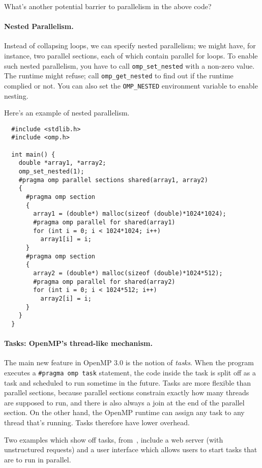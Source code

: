 {\sf What's another potential barrier to parallelism in the above code?}\\

\paragraph{Nested Parallelism.} Instead of collapsing loops, we can
specify nested parallelism; we might have, for instance, two parallel
sections, each of which contain parallel for loops. To enable
such nested parallelism, you have to call \verb+omp_set_nested+ with
a non-zero value. The runtime might refuse; call \verb+omp_get_nested+ to
find out if the runtime complied or not. You can also set the 
\verb+OMP_NESTED+ environment variable to enable nesting.

Here's an example of nested parallelism.
{\small
\begin{verbatim}
  #include <stdlib.h>
  #include <omp.h>

  int main() {
    double *array1, *array2;
    omp_set_nested(1);
    #pragma omp parallel sections shared(array1, array2)
    {
      #pragma omp section
      {
        array1 = (double*) malloc(sizeof (double)*1024*1024);
        #pragma omp parallel for shared(array1)
        for (int i = 0; i < 1024*1024; i++)
          array1[i] = i;
      }
      #pragma omp section
      {
        array2 = (double*) malloc(sizeof (double)*1024*512);
        #pragma omp parallel for shared(array2)
        for (int i = 0; i < 1024*512; i++)
          array2[i] = i;
      }
    }
  }
\end{verbatim}
}

\paragraph{Tasks: OpenMP's thread-like mechanism.}
The main new feature in OpenMP 3.0 is the notion of \emph{tasks}. When
the program executes a \verb+#pragma omp task+ statement, the code
inside the task is split off as a task and scheduled to run sometime
in the future. Tasks are more flexible than parallel sections, because
parallel sections constrain exactly how many threads are supposed to
run, and there is also always a join at the end of the parallel
section.  On the other hand, the OpenMP runtime can assign any task to
any thread that's running. Tasks therefore have lower overhead.

Two examples which show off tasks,
from~\cite{Ayguade:2009:DOT:1512157.1512430}, include a web server (with
unstructured requests) and a user interface which allows users to
start tasks that are to run in parallel.

